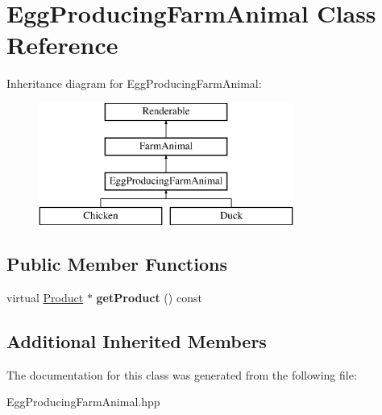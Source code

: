 \hypertarget{class_egg_producing_farm_animal}{}\section{Egg\+Producing\+Farm\+Animal Class Reference}
\label{class_egg_producing_farm_animal}
Inheritance diagram for Egg\+Producing\+Farm\+Animal\+:\begin{figure}[H]
\begin{center}
\leavevmode
\includegraphics[height=4.000000cm]{class_egg_producing_farm_animal}
\end{center}
\end{figure}
\subsection*{Public Member Functions}
\begin{DoxyCompactItemize}
\item 
\mbox{\label{class_egg_producing_farm_animal_a5dcfcb78a2e39aeabdbab4e4cdff7df0}} 
virtual \mbox{\hyperlink{class_product}{Product}} $\ast$ {\bfseries get\+Product} () const
\end{DoxyCompactItemize}
\subsection*{Additional Inherited Members}


The documentation for this class was generated from the following file\+:\begin{DoxyCompactItemize}
\item 
Egg\+Producing\+Farm\+Animal.\+hpp\end{DoxyCompactItemize}
